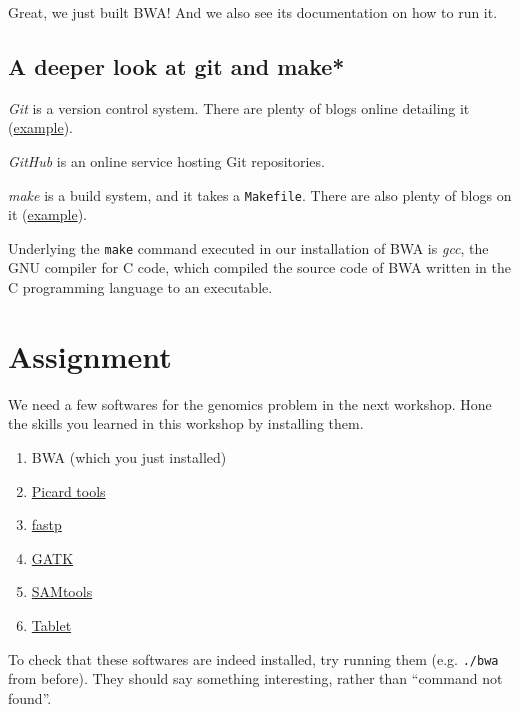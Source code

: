 \documentclass[12pt,letterpaper]{article}
\begin{document}
Great, we just built BWA! And we also see its documentation on how to run it.

\subsection{A deeper look at git and make*}

\textit{Git} is a version control system. There are plenty of blogs online detailing it (\href{https://webtuu.com/blog/04/a-laymans-introduction-to-git}{example}).

\textit{GitHub} is an online service hosting Git repositories.

\textit{make} is a build system, and it takes a \texttt{Makefile}. There are also plenty of blogs on it (\href{https://matt.might.net/articles/intro-to-make/}{example}).

Underlying the \texttt{make} command executed in our installation of BWA is \textit{gcc}, the GNU compiler for C code, which compiled the source code of BWA written in the C programming language to an executable.

\section{Assignment}

We need a few softwares for the genomics problem in the next workshop. Hone the skills you learned in this workshop by installing them.

\begin{enumerate}
   \item BWA (which you just installed)
   \item \href{https://broadinstitute.github.io/picard/}{Picard tools}
   \item \href{https://github.com/OpenGene/fastp}{fastp}
   \item \href{https://github.com/broadinstitute/gatk}{GATK}
   \item \href{http://www.htslib.org/download/}{SAMtools}
   \item \href{https://ics.hutton.ac.uk/tablet/}{Tablet}
\end{enumerate}

To check that these softwares are indeed installed, try running them (e.g. \texttt{./bwa} from before). They should say something interesting, rather than ``command not found''.
\end{document}
